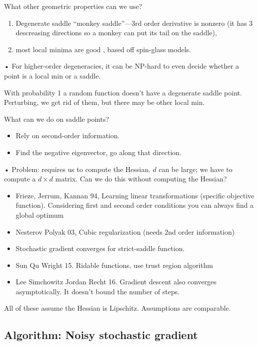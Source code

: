 What other geometric properties can we use?
\begin{enumerate}
\item
 Degenerate saddle \cite{anandkumar2016efficient} ``monkey saddle''---3rd order derivative is nonzero (it has 3 descreasing directions so a monkey can put its tail on the saddle), 
 \item
 most local minima are good \cite{choromanska2015loss}, based off spin-glass models.
\end{enumerate}•
For higher-order degeneracies, it can be NP-hard to even decide whether a point is a local min or a saddle.

With probability 1 a random function doesn't have a degenerate saddle point. Perturbing, we get rid of them, but there may be other local min.

What can we do on saddle points? 
\begin{itemize}
\item
Rely on second-order information. 
\item
Find the negative eigenvector, go along that direction.
\end{itemize}•
Problem: requires us to compute the Hessian. $d$ can be large; we have to compute a $d\times d$ matrix. Can we do this without computing the Hessian?

\begin{itemize}
\item
Frieze, Jerrum, Kannan 94, Learning linear transformations (specific objective function).  Considering first and second order conditions you can always find a global optimum
\item
Nesterov Polyak 03, Cubic regularization (needs 2nd order information)
\item
\cite{ge2015escaping} Stochastic gradient converges for strict-saddle function.
\item
Sun Qu Wright 15. Ridable functions, use trust region algorithm
\item
Lee Simchowitz Jordan Recht 16. Gradient descent also converges asymptotically. It doesn't bound the number of steps.
\end{itemize}
All of these assume the Hessian is Lipschitz. Assumptions are comparable. 


\subsection{Algorithm: Noisy stochastic gradient}


